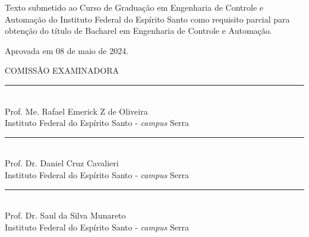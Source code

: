 {
    \center          
    {\MakeUppercase{\imprimirautor}}\par
    \vfill
    {\bfseries\MakeUppercase\imprimirtitulo}\par
    \vspace{10 mm}
    \hspace{.35\textwidth}
    \begin{minipage}{.6\textwidth}
        \SingleSpacing
        Texto submetido ao Curso de Graduação em Engenharia de Controle e Automação do Instituto Federal do Espírito Santo como requisito parcial para obtenção do título de Bacharel em Engenharia de Controle e Automação. 
    \end{minipage}
    
    \vspace{1.4cm}
    
    Aprovada em 08 de maio de 2024.
    
    \vspace{0.8cm}
    
    \MakeUppercase{Comissão Examinadora}
    
    \vspace{0.8cm}
    
    \rule{12cm}{1pt} \\
    Prof. Me. Rafael Emerick Z de Oliveira \\
    Instituto Federal do Espírito Santo - \textit{campus} Serra
    
    \vspace{0.8cm}
    \rule{12cm}{1pt} \\
    Prof. Dr. Daniel Cruz Cavalieri \\
    Instituto Federal do Espírito Santo - \textit{campus} Serra
    
    \vspace{0.8cm}
    \rule{12cm}{1pt} \\
    Prof. Dr. Saul da Silva Munareto \\
    Instituto Federal do Espírito Santo - \textit{campus} Serra
    
    
    \vfill
    {\MakeUppercase\imprimirlocal}\par
    {\imprimirdata}\par
}